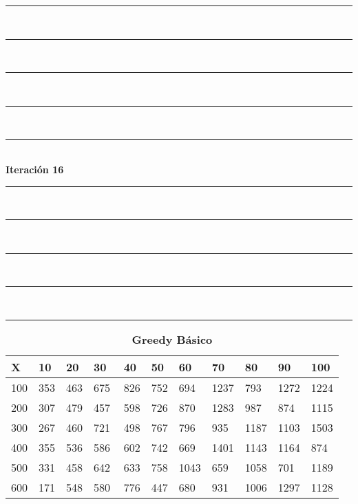 \documentclass[10pt,letterpaper]{article}
\begin{document}
\newpage 
\begin{center}
\newcommand{\HRule}{\rule{\linewidth}{0.5mm}}
\center
\HRule\\[6cm]
\HRule\\[0.4cm]
\HRule\\[0.4cm]
\HRule\\[0.4cm]
\HRule\\[0.4cm]
{\centering \Huge\bfseries Iteración 16}\\[0.4cm]
\HRule\\[0.4cm]
\HRule\\[0.4cm]
\HRule\\[0.4cm]
\HRule\\[6cm]
\HRule
\end{center}
\newpage 
{}
\begin{center}
\begin{table}\renewcommand{\arraystretch}{2.5}
\caption{\large \textbf{Greedy Básico}}
\centering
\begin{tabular} { |m{0.5cm}|m{1.3cm}|m{1.3cm}|m{1.3cm}|m{1.3cm}|m{1.3cm}|m{1.3cm}|m{1.3cm}|m{1.3cm}|m{1.3cm}|m{1.3cm}|} 
\hline
\rowcolor{Gray}
\centering \textbf{X} & \centering \textbf{10} & \centering \textbf{20} & \centering \textbf{30}\ & \centering \textbf{40} & \centering \textbf{50} & \centering \textbf{60}\ & \centering \textbf{70} & \centering \textbf{80} & \centering \textbf{90}\ & \textbf{100} \\\hline
\cellcolor{Gray}100 & \Large 353 & \Large 463 & \Large 675 & \Large 826 & \Large 752 & \Large 694 & \Large 1237 & \Large 793 & \Large 1272 & \Large 1224 \\
\hline
\cellcolor{Gray}200 & \Large 307 & \Large 479 & \Large 457 & \Large 598 & \Large 726 & \Large 870 & \Large 1283 & \Large 987 & \Large 874 & \Large 1115 \\
\hline
\cellcolor{Gray}300 & \Large 267 & \Large 460 & \Large 721 & \Large 498 & \Large 767 & \Large 796 & \Large 935 & \Large 1187 & \Large 1103 & \Large 1503 \\
\hline
\cellcolor{Gray}400 & \Large 355 & \Large 536 & \Large 586 & \Large 602 & \Large 742 & \Large 669 & \Large 1401 & \Large 1143 & \Large 1164 & \Large 874 \\
\hline
\cellcolor{Gray}500 & \Large 331 & \Large 458 & \Large 642 & \Large 633 & \Large 758 & \Large 1043 & \Large 659 & \Large 1058 & \Large 701 & \Large 1189 \\
\hline
\cellcolor{Gray}600 & \Large 171 & \Large 548 & \Large 580 & \Large 776 & \Large 447 & \Large 680 & \Large 931 & \Large 1006 & \Large 1297 & \Large 1128 \\

\end{tabular}
\end{table}
\end{center}
\end{document}

